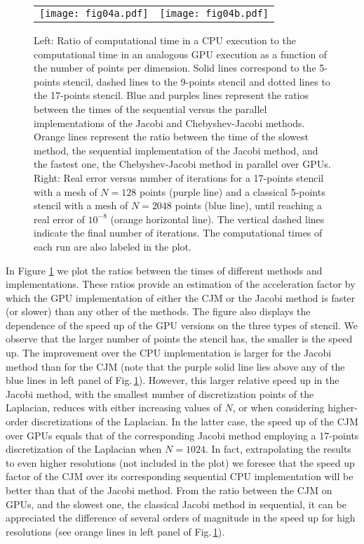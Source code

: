 \documentclass[preprint,12pt]{elsarticle}
\begin{document}
\begin{figure}[hp!]
\centering
\begin{tabular}{cc}
\hspace{-0.2cm}\texttt{[image: fig04a.pdf]} &\hspace{-0.55cm}
\texttt{[image: fig04b.pdf]} 
\end{tabular}

\caption{Left: Ratio of
    computational time in a CPU execution to the computational time in
    an analogous GPU execution as a function of the number of points
    per dimension. Solid lines correspond
  to the 5-points stencil, dashed lines to the 9-points stencil and
  dotted lines to the 17-points stencil. Blue and purples lines
  represent the ratios between the times of the sequential versus the
  parallel implementations of the Jacobi and Chebyshev-Jacobi
  methods. Orange lines represent the ratio between the time of the
  slowest method, the sequential implementation of the Jacobi method,
  and the fastest one, the Chebyshev-Jacobi method in parallel over
  GPUs. Right: Real error versus number of iterations for
  a 17-points stencil with a mesh of $N=128$
  points (purple line) and a classical 5-points stencil with a mesh of
  $N=2048$ points (blue line), until reaching a
  real error of $10^{-8}$ (orange horizontal line). The vertical
  dashed lines indicate the final number of iterations. The
  computational times of each run are also
  labeled in the plot.}
	\label{fig:fig04}
\end{figure}

In Figure \ref{fig:fig04} we plot the ratios
between the times of different methods and
implementations. These ratios provide an estimation of the
  acceleration factor by which the GPU implementation of either the
  CJM or the Jacobi method is faster (or slower) than any other of the
  methods. The figure also displays the
  dependence of the speed up of the GPU versions on the three types
of stencil. We observe that the larger number of
points the stencil has, the smaller is
  the speed up. The improvement over the CPU
  implementation is larger for the Jacobi method than for the CJM
  (note that the purple solid line lies above any of the blue lines in
  left panel of Fig.\,\mbox{\ref{fig:fig04}}). However, this larger
  relative speed up in the Jacobi method, with the smallest number of
  discretization points of the Laplacian, reduces with either
  increasing values of $N$, or when considering higher-order
  discretizations of the Laplacian. In the latter case, the speed up
  of the CJM over GPUs equals that of the corresponding Jacobi method
  employing a 17-points discretization of the Laplacian when
  $N=1024$. In fact, extrapolating the results to even higher resolutions
(not included in the plot) we foresee that the speed up
  factor of the CJM over its corresponding sequential CPU
  implementation will be better than that of the Jacobi
  method. From the ratio between the
CJM on GPUs, and
the slowest one, the classical Jacobi method in sequential, it can be
appreciated the difference of several orders of magnitude in the speed up
for high resolutions (see orange lines in left panel of
  Fig.\,\mbox{\ref{fig:fig04}}).
\end{document}
